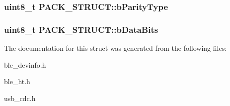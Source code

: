 \hypertarget{struct_p_a_c_k___s_t_r_u_c_t_aa92cdd7b41d7748edc3695fd95fea81c}{
\subsubsection[{b\-Parity\-Type}]{\setlength{\rightskip}{0pt plus 5cm}uint8\-\_\-t P\-A\-C\-K\-\_\-\-S\-T\-R\-U\-C\-T\-::b\-Parity\-Type}}\label{struct_p_a_c_k___s_t_r_u_c_t_aa92cdd7b41d7748edc3695fd95fea81c}
\hypertarget{struct_p_a_c_k___s_t_r_u_c_t_a177009e8452a6c785662e422cc457824}{
\subsubsection[{b\-Data\-Bits}]{\setlength{\rightskip}{0pt plus 5cm}uint8\-\_\-t P\-A\-C\-K\-\_\-\-S\-T\-R\-U\-C\-T\-::b\-Data\-Bits}}\label{struct_p_a_c_k___s_t_r_u_c_t_a177009e8452a6c785662e422cc457824}


The documentation for this struct was generated from the following files\-:\begin{DoxyCompactItemize}
\item 
ble\-\_\-devinfo.\-h\item 
ble\-\_\-ht.\-h\item 
usb\-\_\-cdc.\-h\end{DoxyCompactItemize}
